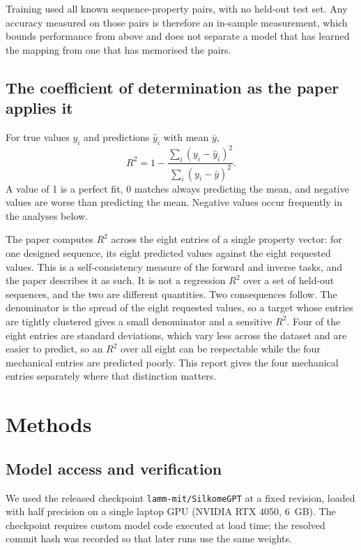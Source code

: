 \documentclass[11pt,a4paper]{article}
\begin{document}
Training used all known sequence-property pairs, with no held-out test set. Any
accuracy measured on those pairs is therefore an in-sample measurement, which
bounds performance from above and does not separate a model that has learned the
mapping from one that has memorised the pairs.

\subsection{The coefficient of determination as the paper applies it}

For true values $y_i$ and predictions $\hat{y}_i$ with mean $\bar{y}$,
\[
R^2 = 1 - \frac{\sum_i (y_i - \hat{y}_i)^2}{\sum_i (y_i - \bar{y})^2}.
\]
A value of 1 is a perfect fit, 0 matches always predicting the mean, and
negative values are worse than predicting the mean. Negative values occur
frequently in the analyses below.

The paper computes $R^2$ across the eight entries of a single property vector:
for one designed sequence, its eight predicted values against the eight
requested values. This is a self-consistency measure of the forward and inverse
tasks, and the paper describes it as such. It is not a regression $R^2$ over a
set of held-out sequences, and the two are different quantities. Two consequences
follow. The denominator is the spread of the eight requested values, so a target
whose entries are tightly clustered gives a small denominator and a sensitive
$R^2$. Four of the eight entries are standard deviations, which vary less across
the dataset and are easier to predict, so an $R^2$ over all eight can be
respectable while the four mechanical entries are predicted poorly. This report
gives the four mechanical entries separately where that distinction matters.

\section{Methods}

\subsection{Model access and verification}

We used the released checkpoint \texttt{lamm-mit/SilkomeGPT} at a fixed
revision, loaded with half precision on a single laptop GPU (NVIDIA RTX 4050,
6~GB). The checkpoint requires custom model code executed at load time; the
resolved commit hash was recorded so that later runs use the same weights.
\end{document}
